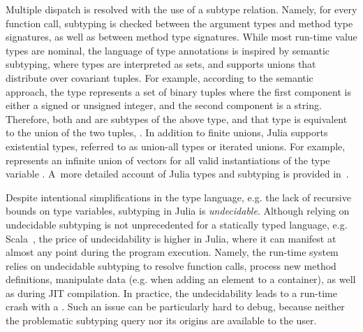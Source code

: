 
Multiple dispatch is resolved with the use of a subtype relation.
Namely, for every function call, subtyping is checked between
the argument types and method type signatures,
as well as between method type signatures.
While most run-time value types are nominal, %
the language of type annotations is inspired by semantic subtyping,
where types are interpreted as sets,
and supports unions that distribute over covariant tuples.
For example, according to the semantic approach, the type 
 represents a set of binary
tuples where the first component is either a signed or unsigned integer,
and the second component is a string. Therefore, both
 and  are subtypes
of the above type, and that type is equivalent to the union of the two
tuples, .
In addition to finite unions, Julia supports existential types, referred to as
union-all types or iterated unions. For example, 
represents an infinite union of vectors  for all valid
instantiations  of the type variable .
A~more detailed account of Julia types and subtyping
is provided in~.

Despite intentional simplifications in the type language,
e.g. the lack of recursive bounds on type variables,
subtyping in Julia is \emph{undecidable}. %
Although relying on undecidable subtyping is not unprecedented
for a statically typed language, e.g. Scala~\cite{bib:hu:dot-undec:2020},
the price of undecidability
is higher in Julia, where it
can manifest at almost any point during the program execution.
Namely, the run-time system relies on undecidable subtyping
to resolve function calls,
process new method definitions,
manipulate data (e.g. when adding an element to a container),
as well as during JIT compilation.
In practice, the undecidability
leads to a run-time crash with a .
Such an issue can be particularly hard to debug,
because neither the problematic subtyping query nor its origins are available
to the user.

